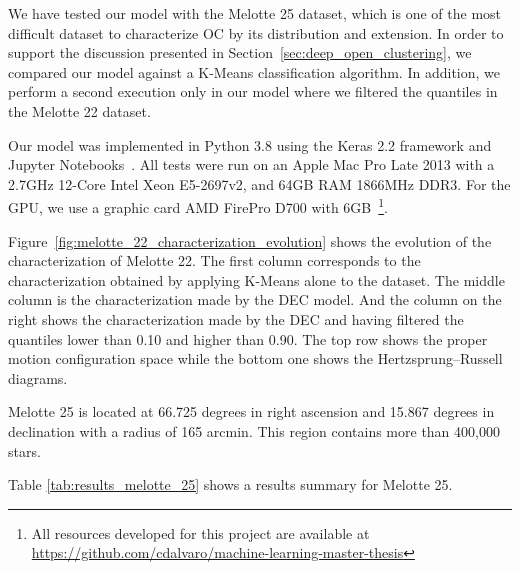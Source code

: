 \documentclass[11pt,a4paper,english,twocolumn]{article}
\begin{document}
We have tested our model with the Melotte 25 dataset, which is one of the most difficult dataset
to characterize OC by its distribution and extension. In order to support the discussion presented
in Section~\ref{sec:deep_open_clustering}, we compared our model against a K-Means classification
algorithm. In addition, we perform a second execution only in our model where we filtered the
quantiles in the Melotte 22 dataset.

Our model was implemented in Python 3.8 using the Keras 2.2 framework and Jupyter
Notebooks~\cite{Kluyver2016jupyter}. All tests were run on an Apple Mac Pro Late 2013 with a
2.7GHz 12-Core Intel Xeon E5-2697v2, and 64GB RAM 1866MHz DDR3. For the GPU, we use a graphic
card AMD FirePro D700 with 6GB~\footnote{All resources developed for this project are available
at \href{https://github.com/cdalvaro/machine-learning-master-thesis}
{https://github.com/cdalvaro/machine-learning-master-thesis}}.


Figure~\ref{fig:melotte_22_characterization_evolution} shows the evolution
of the characterization of Melotte 22. The first column corresponds to the
characterization obtained by applying K-Means alone to the dataset. The middle
column is the characterization made by the DEC model. And the column on the right
shows the characterization made by the DEC and having filtered the quantiles
lower than 0.10 and higher than 0.90. The top row shows the proper motion
configuration space while the bottom one shows the Hertzsprung–Russell diagrams.


Melotte 25 is located at 66.725 degrees in right ascension and 15.867
degrees in declination with a radius of 165 arcmin.
This region contains more than 400,000 stars.

Table \ref{tab:results_melotte_25} shows a results summary for Melotte 25.
\end{document}

